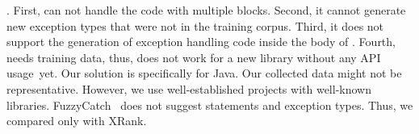 
.
First, {\tool} can not handle the code with multiple 
blocks. Second, it cannot generate new exception types that were not
in the training corpus. Third, it does not support the generation of
exception handling code inside the body of . Fourth,
{\tool} needs training data, thus, does not work for a new library
without any API usage~yet. Our solution is specifically for Java. Our
collected data might not be representative. However, we use
well-established projects with well-known
libraries. FuzzyCatch~\cite{xrank-fse20} does not suggest statements
and exception types. Thus, we compared only with XRank.
